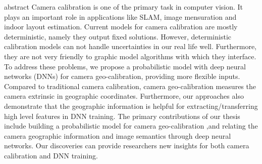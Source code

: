 abstract
Camera calibration is one of the primary task in computer vision.
It plays an important role in applications like SLAM, image
mensuration and indoor layout estimation. Current models for camera
calibration are mostly deterministic, namely they output fixed
solutions. 
However, deterministic calibration models can not handle uncertainties
in our real life well. Furthermore, they are not very friendly to
graphic model algorithms with which they interface.
To address these problems, we propose a probabilistic model with deep
neural networks (DNNs) for camera geo-calibration, providing more
flexible inputs. Compared to traditional camera calibration,
camera geo-calibration measures the camera extrinsic in geographic
coordinates.  Furthermore, our approaches also demonstrate that the
geographic information is helpful for extracting/transferring high
level features in DNN training.  The primary contributions of our
thesis include building a probabilistic model for camera
geo-calibration ,and relating the camera geographic information and
image semantics through deep neural networks. Our discoveries can
provide researchers new insights for both camera calibration and DNN
training.


%
%
